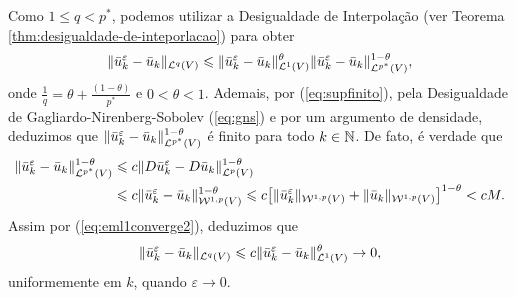 \begin{prf}
    Como $1 \leqslant q < p^*$, podemos utilizar a Desigualdade de Interpolação (ver Teorema \ref{thm:desigualdade-de-inteporlacao}) para obter
    \[
        \Vert \bar u_k^\varepsilon - \bar u_k \Vert_{\mathcal{L}^q(V)} \leqslant \Vert \bar u_k^\varepsilon - \bar u_k \Vert_{\mathcal{L}^1(V)}^\theta \Vert \bar u_k^\varepsilon - \bar u_k \Vert_{\mathcal{L}^{p^*}(V)}^{1- \theta},
    \]
    onde $\frac{1}{q} = \theta + \frac{(1 - \theta)}{p^*}$ e $0 < \theta < 1$.
    Ademais, por (\ref{eq:supfinito}), pela Desigualdade de Gagliardo-Nirenberg-Sobolev (\ref{eq:gns}) e por um argumento de densidade, deduzimos que $\Vert \bar u_k^\varepsilon - \bar u_k \Vert_{\mathcal{L}^{p^*}(V)}^{1- \theta}$ é finito para todo $k \in\mathbb{N}$. De fato, é verdade que
    \begin{equation} \label{eq:idk}
        \begin{aligned}
            \Vert \bar u_k^\varepsilon - \bar u_k \Vert_{\mathcal{L}^{p^*}(V)}^{1 - \theta} &\leqslant c \Vert D\bar u_k^\varepsilon - D\bar u_k \Vert_{\mathcal{L}^p(V)}^{1 - \theta}\\ 
            &\leqslant c \Vert \bar u_k^\varepsilon - \bar u_k \Vert_{\mathcal{W}^{1,p}(V)}^{1- \theta} \leqslant c \big[\Vert \bar u_k^\varepsilon \Vert_{\mathcal{W}^{1,p}(V)} + \Vert \bar u_k \Vert_{\mathcal{W}^{1,p}(V)} \big]^{1-\theta} < cM.
        \end{aligned}
    \end{equation}
    Assim por (\ref{eq:eml1converge2}), deduzimos que
    \[
        \Vert \bar u_k^\varepsilon - \bar u_k \Vert_{\mathcal{L}^q(V)} \leqslant c \Vert \bar u_k^\varepsilon - \bar u_k \Vert_{\mathcal{L}^1(V)}^\theta \to 0,
    \]
    uniformemente em $k$, quando $\varepsilon \to 0$.


\end{prf}
